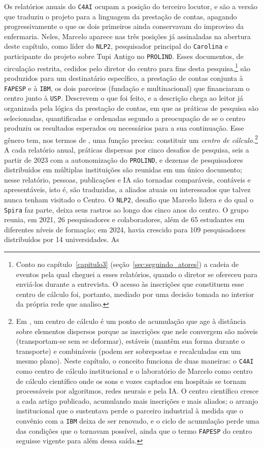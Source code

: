 Os relatórios anuais do \texttt{C4AI} ocupam a posição do terceiro locutor, e são a versão que traduziu o projeto para a linguagem da prestação de contas, apagando progressivamente o que os dois primeiros ainda conservavam do improviso da enfermaria. Neles, Marcelo aparece nas três posições já assinaladas na abertura deste capítulo, como líder do \texttt{NLP2}, pesquisador principal do \texttt{Carolina} e participante do projeto sobre Tupi Antigo no \texttt{PROLIND}. Esses documentos, de circulação restrita, cedidos pelo diretor do centro para fins desta pesquisa,\footnote{Conto no capítulo~\ref{capitulo3} (seção~\ref{sec:seguindo_atores}) a cadeia de eventos pela qual cheguei a esses relatórios, quando o diretor se ofereceu para enviá-los durante a entrevista. O acesso às inscrições que constituem esse centro de cálculo foi, portanto, mediado por uma decisão tomada no interior da própria rede que analiso.} são produzidos para um destinatário específico, a prestação de contas conjunta à \texttt{FAPESP} e à \texttt{IBM}, os dois parceiros (fundação e multinacional) que financiaram o centro junto à \texttt{USP}. Descrevem o que foi feito, e a descrição chega ao leitor já organizada pela lógica da prestação de contas, em que as práticas de pesquisa são selecionadas, quantificadas e ordenadas segundo a preocupação de se o centro produziu os resultados esperados ou necessários para a sua continuação. Esse gênero tem, nos termos de \textcite{Latour2011CienciaEmAcao}, uma função precisa: constituir um \textit{centro de cálculo}.\footnote{Em \textcite{Latour2011CienciaEmAcao}, um centro de cálculo é um ponto de acumulação que age à distância sobre elementos dispersos porque as inscrições que nele convergem são móveis (transportam-se sem se deformar), estáveis (mantêm sua forma durante o transporte) e combináveis (podem ser sobrepostas e recalculadas em um mesmo plano). Neste capítulo, o conceito funciona de duas maneiras: o \texttt{C4AI} como centro de cálculo institucional e o laboratório de Marcelo como centro de cálculo científico onde os sons e vozes captados em hospitais se tornam processáveis por algoritmos, redes neurais e pela IA. O centro científico cresce a cada artigo publicado, acumulando mais inscrições e mais aliados; o arranjo institucional que o sustentava perde o parceiro industrial à medida que o convênio com a \texttt{IBM} deixa de ser renovado, e o ciclo de acumulação perde uma das condições que o tornavam possível, ainda que o termo \texttt{FAPESP} do centro seguisse vigente para além dessa saída.} A cada relatório anual, práticas dispersas por cinco desafios de pesquisa, seis a partir de 2023 com a autonomização do \texttt{PROLIND}, e dezenas de pesquisadores distribuídos em múltiplas instituições são reunidas em um único documento; nesse relatório, pessoas, publicações e IA são tornadas comparáveis, contáveis e apresentáveis, isto é, são traduzidas, a aliados atuais ou interessados que talvez nunca tenham visitado o Centro. O \texttt{NLP2}, desafio que Marcelo lidera e do qual o \texttt{Spira} faz parte, deixa seus rastros ao longo dos cinco anos do centro. O grupo reunia, em 2021, 26 pesquisadores e colaboradores, além de 65 estudantes em diferentes níveis de formação; em 2024, havia crescido para 109 pesquisadores distribuídos por 14 universidades. As 